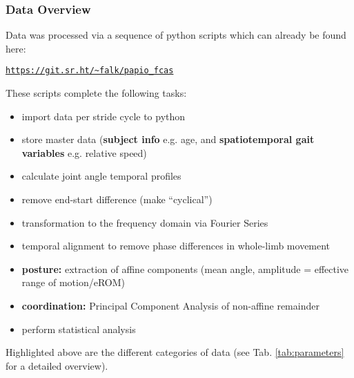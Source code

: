 \subsubsection{Data Overview}
\label{intro:dataprep}
Data was processed via a sequence of python scripts which can already be found here: \begin{center}\href{https://git.sr.ht/\~falk/papio\_fcas}{\nolinkurl{https://git.sr.ht/~falk/papio_fcas}}\end{center}
These scripts complete the following tasks:
\begin{itemize}
\item import data per stride cycle to python
\item store master data (\textbf{subject info} e.g. age, and \textbf{spatiotemporal gait variables} e.g. relative speed)
\item calculate joint angle temporal profiles
\item remove end-start difference (make ``cyclical'')
\item transformation to the frequency domain via Fourier Series
\item temporal alignment to remove phase differences in whole-limb movement
\item \textbf{posture:} extraction of affine components (mean  angle, amplitude = effective range of motion/eROM)
\item \textbf{coordination:} Principal Component Analysis of non-affine remainder
\item perform statistical analysis
\end{itemize}


Highlighted above are the different categories of data (see Tab. \ref{tab:parameters} for a detailed overview).


